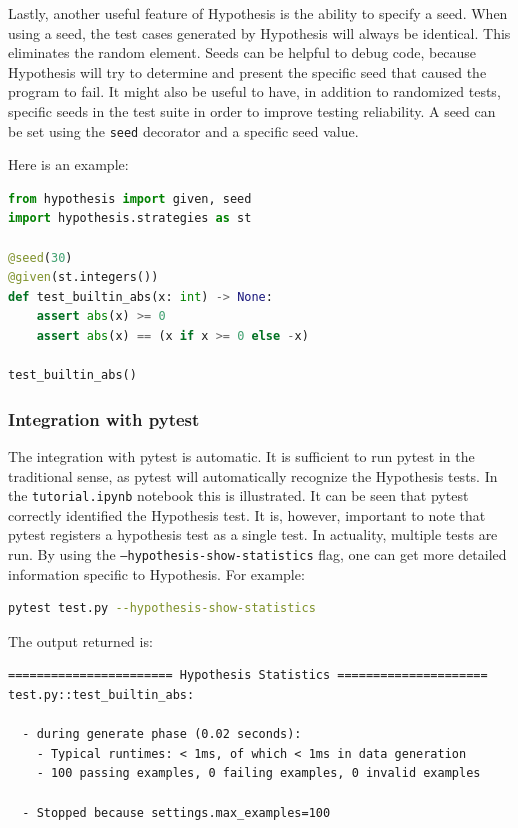 \documentclass[runningheads]{llncs}
\begin{document}
\noindent Lastly, another useful feature of Hypothesis is the ability to specify a seed. When using a seed, the test cases generated by Hypothesis will always be identical. This eliminates the random element. Seeds can be helpful to debug code, because Hypothesis will try to determine and present the specific seed that caused the program to fail. It might also be useful to have, in addition to randomized tests, specific seeds in the test suite in order to improve testing reliability. A seed can be set using the \texttt{seed} decorator and a specific seed value.

\newpage
\noindent Here is an example:
\begin{lstlisting}[language=Python,caption={Specifying Seeds in Hypothesis from code/tutorial.ipynb}]
from hypothesis import given, seed
import hypothesis.strategies as st

@seed(30)
@given(st.integers())
def test_builtin_abs(x: int) -> None:
    assert abs(x) >= 0
    assert abs(x) == (x if x >= 0 else -x)

test_builtin_abs()
\end{lstlisting}

\subsubsection{Integration with pytest}
The integration with pytest is automatic. It is sufficient to run pytest in the traditional sense, as pytest will automatically recognize the Hypothesis tests. In the \texttt{tutorial.ipynb} notebook this is illustrated. It can be seen that pytest correctly identified the Hypothesis test. It is, however, important to note that pytest registers a hypothesis test as a single test. In actuality, multiple tests are run. By using the \texttt{--hypothesis-show-statistics} flag, one can get more detailed information specific to Hypothesis. For example:
\begin{lstlisting}[language=bash]
  pytest test.py --hypothesis-show-statistics
\end{lstlisting}

\noindent The output returned is:
\begin{verbatim}
======================= Hypothesis Statistics =====================
test.py::test_builtin_abs:

  - during generate phase (0.02 seconds):
    - Typical runtimes: < 1ms, of which < 1ms in data generation
    - 100 passing examples, 0 failing examples, 0 invalid examples

  - Stopped because settings.max_examples=100
\end{verbatim}
\end{document}
